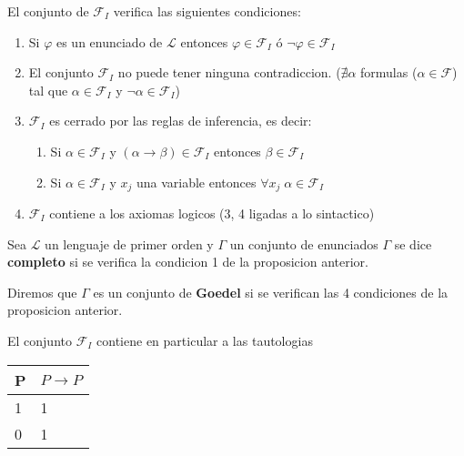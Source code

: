 \begin{proposition}

El conjunto de $\mathcal{F}_{I}$ verifica las siguientes condiciones:

\begin{enumerate}
	\item Si $\varphi$ es un enunciado de $\mathcal{L}$ entonces $\varphi \in \mathcal{F}_{I}$ \'o $\neg \varphi \in \mathcal{F}_{I}$
	\item El conjunto $\mathcal{F}_{I}$ no puede tener ninguna contradiccion. ($\nexists \alpha $ formulas ($\alpha \in \mathcal{F}$) tal que $\alpha \in \mathcal{F}_{I}$ y $\neg \alpha \in \mathcal{F}_{I}$)
	\item $\mathcal{F}_{I}$ es cerrado por las reglas de inferencia, es decir:
		\begin{enumerate}
			\item Si $\alpha \in \mathcal{F}_{I}$ y $(\alpha \rightarrow \beta) \in \mathcal{F}_{I}$ entonces $\beta \in \mathcal{F}_{I}$
			\item Si $\alpha \in \mathcal{F}_{I}$ y $x_j$ una variable entonces $\forall x_j \; \alpha \in \mathcal{F}_{I}$
		\end{enumerate}
	\item $\mathcal{F}_{I}$ contiene a los axiomas logicos (3, 4 ligadas a lo sintactico)
\end{enumerate}

\end{proposition}

\begin{definition}

	Sea $\mathcal{L}$ un lenguaje de primer orden y $\Gamma$ un conjunto de enunciados $\Gamma$ se dice \textbf{completo} si se verifica la condicion 1 de la proposicion anterior.
		
\end{definition}

\begin{definition}

Diremos que $\Gamma$ es un conjunto de \textbf{Goedel} si se verifican las 4 
condiciones de la proposicion anterior.

\end{definition}

\begin{observation}

El conjunto $\mathcal{F}_{I}$ contiene en particular a las tautologias

\begin{center}
\begin{tabular}{p{}p{}}
  \hline			
  P & $P \rightarrow P$ \\ \hline
  1 & 1  \\ \hline
  0 & 1  \\ \hline  
\end{tabular}
\end{center}

\end{observation}

